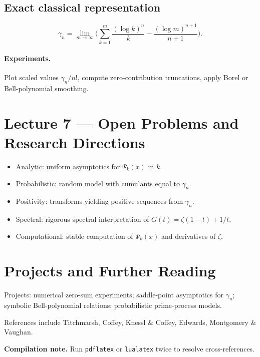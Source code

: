 \documentclass[11pt]{article}
\begin{document}
\subsection*{Exact classical representation}
\[
\gamma_n=\lim_{m\to\infty}\Big(\sum_{k=1}^m\frac{(\log k)^n}{k}-\frac{(\log m)^{n+1}}{n+1}\Big).
\]

\paragraph{Experiments.} Plot scaled values $\gamma_n/n!$, compute zero-contribution truncations, apply Borel or Bell-polynomial smoothing.

\section{Lecture 7 --- Open Problems and Research Directions}
\begin{itemize}[leftmargin=*]
\item Analytic: uniform asymptotics for $\Psi_k(x)$ in $k$.
\item Probabilistic: random model with cumulants equal to $\gamma_n$.
\item Positivity: transforms yielding positive sequences from $\gamma_n$.
\item Spectral: rigorous spectral interpretation of $G(t)=\zeta(1-t)+1/t$.
\item Computational: stable computation of $\Psi_k(x)$ and derivatives of $\zeta$.
\end{itemize}

\section*{Projects and Further Reading}
Projects: numerical zero-sum experiments; saddle-point asymptotics for $\gamma_n$; symbolic Bell-polynomial relations; probabilistic prime-process models.

References include Titchmarsh, Coffey, Knessl \& Coffey, Edwards, Montgomery \& Vaughan.

\bigskip
\noindent\textbf{Compilation note.} Run \texttt{pdflatex} or \texttt{lualatex} twice to resolve cross-references.
\end{document}
